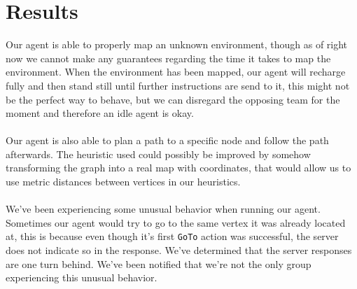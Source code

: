 \documentclass[11pt]{report}
\begin{document}
\section*{Results}
Our agent is able to properly map an unknown environment, though as of right now we cannot make any guarantees regarding the time it takes to map the environment. When the environment has been mapped, our agent will recharge fully and then stand still until further instructions are send to it, this might not be the perfect way to behave, but we can disregard the opposing team for the moment and therefore an idle agent is okay.\\
\\
Our agent is also able to plan a path to a specific node and follow the path afterwards. The heuristic used could possibly be improved by somehow transforming the graph into a real map with coordinates, that would allow us to use metric distances between vertices in our heuristics.\\
\\
We've been experiencing some unusual behavior when running our agent. Sometimes our agent would try to go to the same vertex it was already located at, this is because even though it's first {\tt GoTo} action was successful, the server does not indicate so in the response. We've determined that the server responses are one turn behind. We've been notified that we're not the only group experiencing this unusual behavior.
\end{document}
